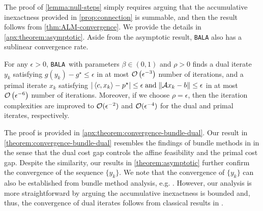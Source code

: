 \documentclass[11pt]{article}
\newcommand{\alg}{\texttt{BALA}}%
\begin{document}
The proof of \cref{lemma:null-steps} simply requires arguing that the accumulative inexactness provided in \cref{prop:connection} is summable, and then the result follows from \cref{thm:ALM-convergence}. We provide the details in \cref{apx:theorem:asymptotic}. Aside from the asymptotic result, \alg{} also has a sublinear convergence rate.
\begin{theorem}
    \label{theorem:convergence-bundle-dual}
    For any $\epsilon > 0$, \alg~with parameters $\beta \in (0,1)$ and $\rho > 0$ finds a dual iterate $y_k$ satisfying $g(y_k) - g^\star \leq \epsilon$ in at most $ \mathcal{O} \left (\epsilon^{-3}\right )$ number of iterations, and a primal iterate $x_k$ satisfying
    $
            |\left \langle c, x_k \right\rangle - p^\star| \leq \epsilon\; \text{and}\; \|\mathcal{A} x_k - b\| \leq \epsilon
    $
    in at most $ \mathcal{O} \left ( \epsilon^{-6} \right )$ number of iterations. Moreover, if we choose $\rho = \epsilon$, then the iteration complexities are improved to $\mathcal{O}(\epsilon^{-2})$ and $\mathcal{O}(\epsilon^{-4})$ for the dual and primal iterates, respectively. 
\end{theorem}
The proof is provided in \cref{apx:theorem:convergence-bundle-dual}. Our result in \cref{theorem:convergence-bundle-dual} resembles the findings of bundle methods in \cite[Lemma 3.4-3.6]{ding2023revisiting} in the sense that the dual cost gap controls the affine feasibility and the primal cost gap. Despite the similarity, our results in \cref{theorem:asymptotic} further confirm the convergence of the sequence $\{y_k\}$. We note that the convergence of $\{y_k\}$ can also be established from bundle method analysis, e.g. \cite[Theorem 7.16]{ruszczynski2011nonlinear}. However, our analysis is more straightforward by arguing the accumulative inexactness is bounded and, thus, the convergence of dual iterates follows from classical results in \cite{rockafellar1976augmented}.
\end{document}
